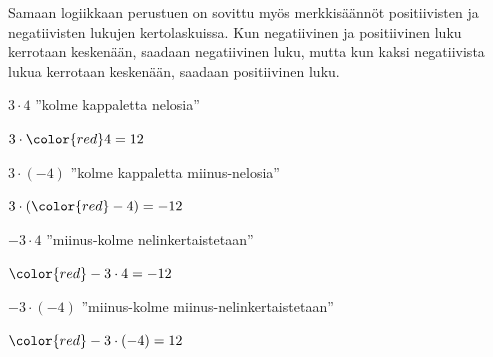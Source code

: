     Samaan logiikkaan perustuen on sovittu myös merkkisäännöt positiivisten ja negatiivisten lukujen kertolaskuissa. Kun negatiivinen ja positiivinen luku kerrotaan keskenään, saadaan negatiivinen luku, mutta kun kaksi negatiivista lukua kerrotaan keskenään, saadaan positiivinen luku.

    $3 \cdot 4$ ''kolme kappaletta nelosia''
    
   \begin{center}
    \begin{lukusuora}{-1}{14}{14}
	\color{red} 
	\color{red} 
	\color{red} 

      \end{lukusuora}
      $3\cdot {\color{red}4}=12$
    \end{center}
    
    $3 \cdot (-4)$ ''kolme kappaletta miinus-nelosia''
    
    
    \begin{center}
    \begin{lukusuora}{-13}{2}{14}
	\color{red} 
	\color{red} 
	\color{red} 

      \end{lukusuora}
      $3\cdot ({\color{red}-4})=-12$
    \end{center}
    
    $-3 \cdot 4$ ''miinus-kolme nelinkertaistetaan''
    
    \begin{center}
    \begin{lukusuora}{-13}{2}{14}
	\color{red} 
	\color{red} 
	\color{red} 
	\color{red} 

      \end{lukusuora}
      ${\color{red}-3}\cdot 4=-12$
    \end{center}
    
    $-3 \cdot (-4)$ ''miinus-kolme miinus-nelinkertaistetaan''
    
    \begin{center}
    \begin{lukusuora}{-1}{14}{14}
	\color{red} 
	\color{red} 
	\color{red} 
	\color{red} 

      \end{lukusuora}
      ${\color{red}-3}\cdot (-4)=12$
    \end{center}

